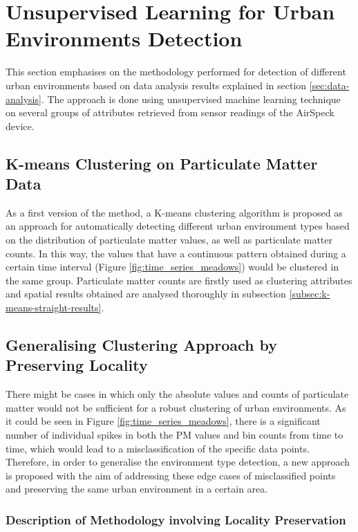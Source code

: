 \documentclass[bsc,frontabs,twoside,singlespacing, parskip,deptreport]{infthesis}     %
\begin{document}
\section{Unsupervised Learning for Urban Environments Detection}

This section emphasises on the methodology performed for detection of different urban environments based on data analysis results explained in section \ref{sec:data-analysis}. The approach is done using unsupervised machine learning technique on several groups of attributes retrieved from sensor readings of the AirSpeck device.

\subsection{K-means Clustering on Particulate Matter Data}
\label{subsec:k-means-methodology}

As a first version of the method, a K-means clustering algorithm is proposed as an approach for automatically detecting different urban environment types based on the distribution of particulate matter values, as well as particulate matter counts. In this way, the values that have a continuous pattern obtained during a certain time interval (Figure \ref{fig:time_series_meadows}) would be clustered in the same group. Particulate matter counts are firstly used as clustering attributes and spatial results obtained are analysed thoroughly in subsection \ref{subsec:k-means-straight-results}.

\subsection{Generalising Clustering Approach by Preserving Locality}
\label{subsec:generic-clustering}

There might be cases in which only the absolute values and counts of particulate matter would not be sufficient for a robust clustering of urban environments. As it could be seen in Figure \ref{fig:time_series_meadows}, there is a significant number of individual spikes in both the PM values and bin counts  from time to time, which would lead to a misclassification of the specific data points. Therefore, in order to generalise the environment type detection, a new approach is proposed with the aim of addressing these edge cases of misclassified points and preserving the same urban environment in a certain area. 

\subsubsection*{Description of Methodology involving Locality Preservation}
\end{document}
